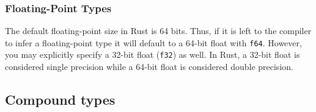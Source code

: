 \documentclass[12pt,notitlepage]{article}
\begin{document}
\subsubsection{Floating-Point Types}

The default floating-point size in Rust is 64 bits. Thus, if it is left to the
compiler to infer a floating-point type it will default to a 64-bit float with
\lstinline{f64}.  However, you may explicitly specify a 32-bit float
(\lstinline{f32}) as well. In Rust, a 32-bit float is considered single
precision while a 64-bit float is considered double precision.



\subsection{Compound types}
\end{document}
